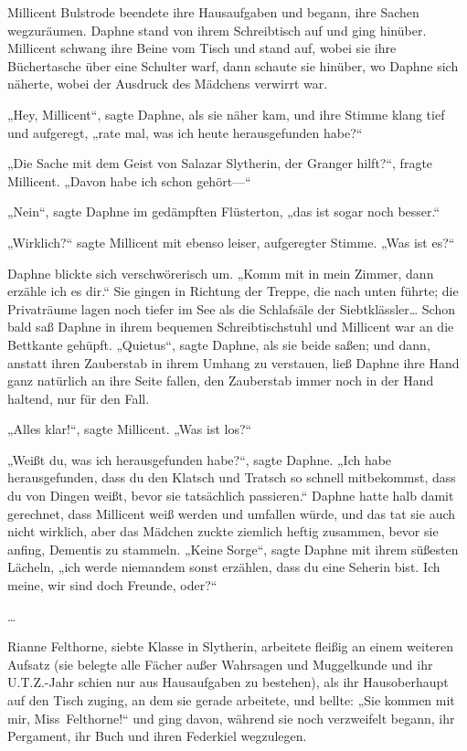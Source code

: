 {Millicent Bulstrode beendete ihre Hausaufgaben und begann, ihre Sachen wegzuräumen. Daphne stand von ihrem Schreibtisch auf und ging hinüber. Millicent schwang ihre Beine vom Tisch und stand auf, wobei sie ihre Büchertasche über eine Schulter warf, dann schaute sie hinüber, wo Daphne sich näherte, wobei der Ausdruck des Mädchens verwirrt war.

„Hey, Millicent“, sagte Daphne, als sie näher kam, und ihre Stimme klang tief und aufgeregt, „rate mal, was ich heute herausgefunden habe?“

„Die Sache mit dem Geist von Salazar Slytherin, der Granger hilft?“, fragte Millicent. „Davon habe ich schon gehört—“

„Nein“, sagte Daphne im gedämpften Flüsterton, „das ist sogar noch besser.“

„Wirklich?“ sagte Millicent mit ebenso leiser, aufgeregter Stimme. „Was ist es?“

Daphne blickte sich verschwörerisch um. „Komm mit in mein Zimmer, dann erzähle ich es dir.“ Sie gingen in Richtung der Treppe, die nach unten führte; die Privaträume lagen noch tiefer im See als die Schlafsäle der Siebtklässler… Schon bald saß Daphne in ihrem bequemen Schreibtischstuhl und Millicent war an die Bettkante gehüpft. „Quietus“, sagte Daphne, als sie beide saßen; und dann, anstatt ihren Zauberstab in ihrem Umhang zu verstauen, ließ Daphne ihre Hand ganz natürlich an ihre Seite fallen, den Zauberstab immer noch in der Hand haltend, nur für den Fall.

„Alles klar!“, sagte Millicent. „Was ist los?“

„Weißt du, was ich herausgefunden habe?“, sagte Daphne. „Ich habe herausgefunden, dass du den Klatsch und Tratsch so schnell mitbekommst, dass du von Dingen weißt, bevor sie tatsächlich passieren.“ Daphne hatte halb damit gerechnet, dass Millicent weiß werden und umfallen würde, und das tat sie auch nicht wirklich, aber das Mädchen zuckte ziemlich heftig zusammen, bevor sie anfing, Dementis zu stammeln. „Keine Sorge“, sagte Daphne mit ihrem süßesten Lächeln, „ich werde niemandem sonst erzählen, dass du eine Seherin bist. Ich meine, wir sind doch Freunde, oder?“

…

Rianne Felthorne, siebte Klasse in Slytherin, arbeitete fleißig an einem weiteren Aufsatz (sie belegte alle Fächer außer Wahrsagen und Muggelkunde und ihr U.T.Z.-Jahr schien nur aus Hausaufgaben zu bestehen), als ihr Hausoberhaupt auf den Tisch zuging, an dem sie gerade arbeitete, und bellte: „Sie kommen mit mir, Miss~Felthorne!“ und ging davon, während sie noch verzweifelt begann, ihr Pergament, ihr Buch und ihren Federkiel wegzulegen.

}
